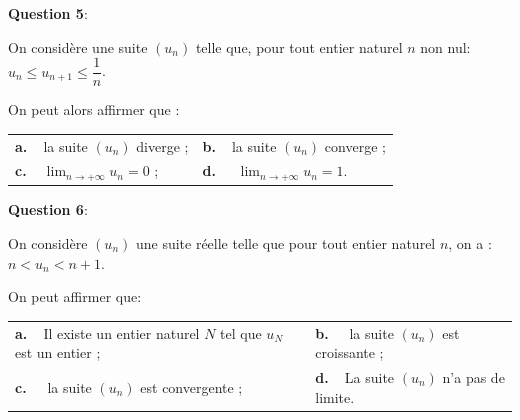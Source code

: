\documentclass[10pt]{article}
\begin{document}
\textbf{Question 5}:

\medskip

On considère une suite $\left(u_n\right)$ telle que, pour tout entier naturel $n$ non nul: $u_n \leqslant  u_{n+1}  \leqslant \dfrac1n$.

On peut alors affirmer que : 

\begin{center}
\begin{tabularx}{\linewidth}{X X}
\textbf{a.~~}la suite $\left(u_n\right)$ diverge ;&\textbf{b.~~}la suite $\left(u_n\right)$ converge ;\\
\textbf{c.~~}$\displaystyle\lim_{n \to + \infty} u_n =  0$ ;&\textbf{d.~~} $\displaystyle\lim_{n \to + \infty} u_n =  1$.
\end{tabularx}
\end{center}

\medskip

\textbf{Question 6}:

\medskip

On considère $\left(u_n\right)$ une suite réelle telle que pour tout entier naturel $n$, on a : $n < u_n < n + 1$. 

On peut affirmer que:

\begin{center}
\begin{tabularx}{\linewidth}{X X}
\textbf{a.~~}Il existe un entier naturel $N$ tel que $u_N$ est un entier ;&\textbf{b.~~} la suite $\left(u_n\right)$ est croissante ;\\
\textbf{c.~~} la suite $\left(u_n\right)$ est convergente ;&\textbf{d.~~}La suite $\left(u_n\right)$ n'a pas de limite.
\end{tabularx}
\end{center}



\bigskip
\end{document}
